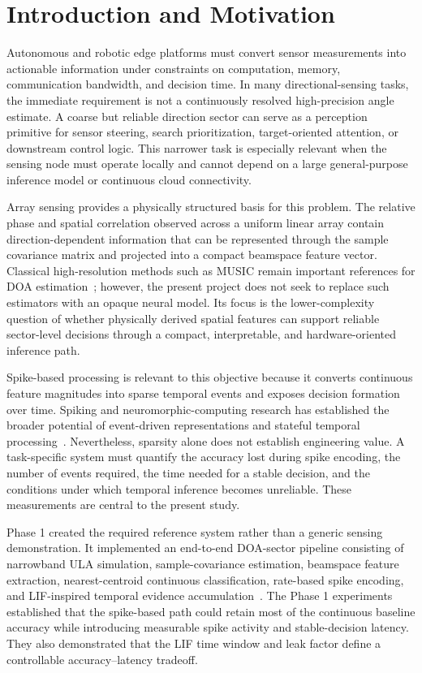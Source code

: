 \section{Introduction and Motivation}

Autonomous and robotic edge platforms must convert sensor measurements into actionable information under constraints on computation, memory, communication bandwidth, and decision time. In many directional-sensing tasks, the immediate requirement is not a continuously resolved high-precision angle estimate. A coarse but reliable direction sector can serve as a perception primitive for sensor steering, search prioritization, target-oriented attention, or downstream control logic. This narrower task is especially relevant when the sensing node must operate locally and cannot depend on a large general-purpose inference model or continuous cloud connectivity.

Array sensing provides a physically structured basis for this problem. The relative phase and spatial correlation observed across a uniform linear array contain direction-dependent information that can be represented through the sample covariance matrix and projected into a compact beamspace feature vector. Classical high-resolution methods such as MUSIC remain important references for DOA estimation~\cite{schmidt1986music}; however, the present project does not seek to replace such estimators with an opaque neural model. Its focus is the lower-complexity question of whether physically derived spatial features can support reliable sector-level decisions through a compact, interpretable, and hardware-oriented inference path.

Spike-based processing is relevant to this objective because it converts continuous feature magnitudes into sparse temporal events and exposes decision formation over time. Spiking and neuromorphic-computing research has established the broader potential of event-driven representations and stateful temporal processing~\cite{maass1997networks,roy2019towards,schuman2022opportunities}. Nevertheless, sparsity alone does not establish engineering value. A task-specific system must quantify the accuracy lost during spike encoding, the number of events required, the time needed for a stable decision, and the conditions under which temporal inference becomes unreliable. These measurements are central to the present study.

Phase 1 created the required reference system rather than a generic sensing demonstration. It implemented an end-to-end DOA-sector pipeline consisting of narrowband ULA simulation, sample-covariance estimation, beamspace feature extraction, nearest-centroid continuous classification, rate-based spike encoding, and LIF-inspired temporal evidence accumulation~\cite{molhem2026phase1}. The Phase 1 experiments established that the spike-based path could retain most of the continuous baseline accuracy while introducing measurable spike activity and stable-decision latency. They also demonstrated that the LIF time window and leak factor define a controllable accuracy--latency tradeoff.

